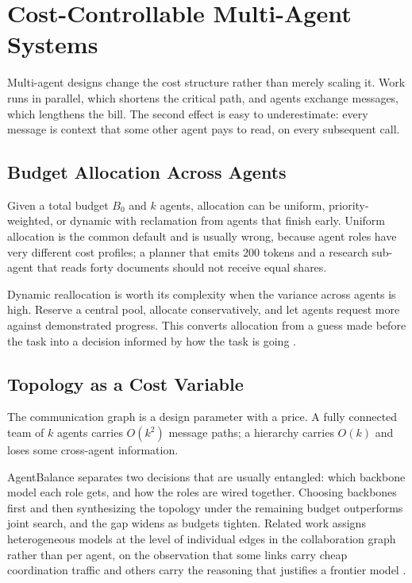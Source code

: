 \documentclass[11pt]{book}
\begin{document}
\section{Cost-Controllable Multi-Agent Systems}

Multi-agent designs change the cost structure rather than merely scaling it. Work runs in parallel, which shortens the critical path, and agents exchange messages, which lengthens the bill. The second effect is easy to underestimate: every message is context that some other agent pays to read, on every subsequent call.

\subsection{Budget Allocation Across Agents}

Given a total budget $B_0$ and $k$ agents, allocation can be uniform, priority-weighted, or dynamic with reclamation from agents that finish early. Uniform allocation is the common default and is usually wrong, because agent roles have very different cost profiles; a planner that emits 200 tokens and a research sub-agent that reads forty documents should not receive equal shares.

Dynamic reallocation is worth its complexity when the variance across agents is high. Reserve a central pool, allocate conservatively, and let agents request more against demonstrated progress. This converts allocation from a guess made before the task into a decision informed by how the task is going \cite{progrouter2026}.

\subsection{Topology as a Cost Variable}

The communication graph is a design parameter with a price. A fully connected team of $k$ agents carries $O(k^2)$ message paths; a hierarchy carries $O(k)$ and loses some cross-agent information.

AgentBalance \cite{agentbalance2025} separates two decisions that are usually entangled: which backbone model each role gets, and how the roles are wired together. Choosing backbones first and then synthesizing the topology under the remaining budget outperforms joint search, and the gap widens as budgets tighten. Related work assigns heterogeneous models at the level of individual edges in the collaboration graph rather than per agent, on the observation that some links carry cheap coordination traffic and others carry the reasoning that justifies a frontier model \cite{scmas2026}.
\end{document}
